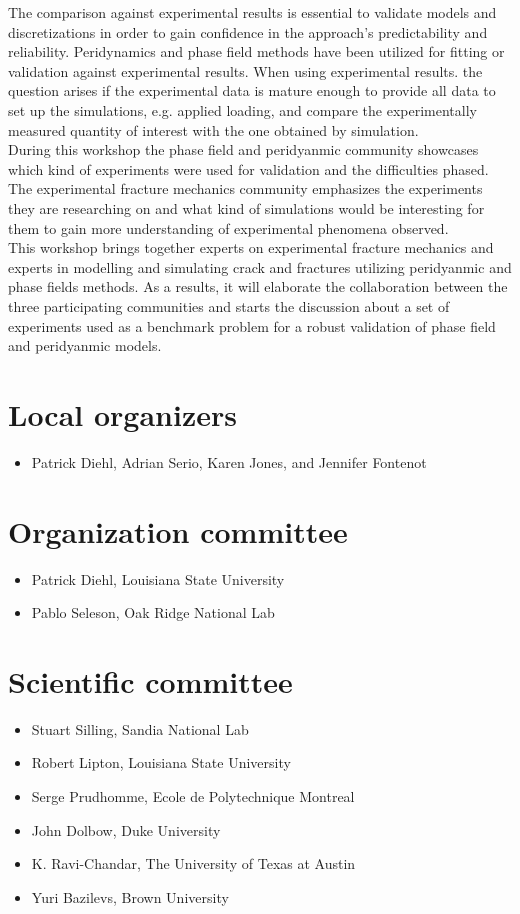 The comparison against experimental results is essential to validate models and discretizations in order to gain confidence in the approach’s predictability and reliability. Peridynamics and phase field methods have been utilized for fitting or validation against experimental results. When using experimental results. the question arises if the experimental data is mature enough to provide all data to set up the simulations, e.g. applied loading, and compare the experimentally measured quantity of interest with the one obtained by simulation. \\

During this workshop the phase field and peridyanmic community showcases which kind of experiments were used for validation and the difficulties phased. The experimental fracture mechanics community emphasizes the experiments they are researching on and what kind of simulations would be interesting for them to gain more understanding of experimental phenomena observed. \\

This workshop brings together experts on experimental fracture mechanics and experts in modelling and simulating crack and fractures utilizing peridyanmic and phase fields methods. As a results, it will elaborate the collaboration between the three participating communities and starts the discussion about a set of experiments used as a benchmark problem for a robust validation of phase field and peridyanmic models.



\section*{Local organizers}
\begin{itemize}
    \item Patrick Diehl, Adrian Serio, Karen Jones, and Jennifer Fontenot 
\end{itemize}

\section*{Organization committee }
\begin{itemize}
\item Patrick Diehl, Louisiana State University
\item Pablo Seleson, Oak Ridge National Lab
\end{itemize}

\section*{Scientific committee}
\begin{itemize}
\item Stuart Silling, Sandia National Lab
\item Robert Lipton, Louisiana State University
\item Serge Prudhomme, Ecole de Polytechnique Montreal
\item John Dolbow, Duke University
\item K. Ravi-Chandar, The University of Texas at Austin
\item Yuri Bazilevs, Brown University 
\end{itemize}
